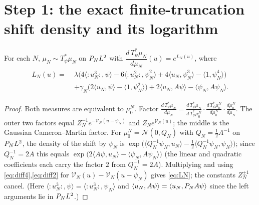 \section*{Step 1: the exact finite-truncation shift density and its logarithm}

\begin{qonelemma}\label{lem:density}
For each $N$, $\mu_N\sim T_\psi^*\mu_N$ on $P_N L^2$ with
$\dfrac{d\,T_\psi^*\mu_N}{d\mu_N}(u)=e^{L_N(u)}$, where
\begin{equation}\label{eq:LN}
\begin{aligned}
L_N(u)=\;&\lambda\bigl(4\langle{:}u_N^3{:},\psi\rangle-6\langle{:}u_N^2{:},\psi_N^2\rangle+4\langle u_N,\psi_N^3\rangle-\langle1,\psi_N^4\rangle\bigr)\\
&+\gamma_N\bigl(2\langle u_N,\psi\rangle-\langle1,\psi_N^2\rangle\bigr)+2\langle u_N,A\psi\rangle-\langle\psi_N,A\psi_N\rangle .
\end{aligned}
\end{equation}
\end{qonelemma}
\begin{proof}
Both measures are equivalent to $\mu_0^N$. Factor
$\frac{d\,T_\psi^*\mu_N}{d\mu_N}=\frac{d\,T_\psi^*\mu_N}{d\,T_\psi^*\mu_0^N}\cdot\frac{d\,T_\psi^*\mu_0^N}{d\mu_0^N}\cdot\frac{d\mu_0^N}{d\mu_N}$.
The outer two factors equal $Z_N^{-1}e^{-\mathcal V_N(u-\psi_N)}$ and
$Z_Ne^{\mathcal V_N(u)}$; the middle is the Gaussian Cameron--Martin factor. For
$\mu_0^N=\mathcal N(0,Q_N)$ with $Q_N=\tfrac12A^{-1}$ on $P_N L^2$, the density of the
shift by $\psi_N$ is
$\exp\bigl(\langle Q_N^{-1}\psi_N,u_N\rangle-\tfrac12\langle Q_N^{-1}\psi_N,\psi_N\rangle\bigr)$;
since $Q_N^{-1}=2A$ this equals
$\exp\bigl(2\langle A\psi,u_N\rangle-\langle\psi_N,A\psi_N\rangle\bigr)$ (the linear and
quadratic coefficients each carry the factor $2$ from $Q_N^{-1}=2A$).
Multiplying and using \eqref{eq:diff4},\eqref{eq:diff2} for
$\mathcal V_N(u)-\mathcal V_N(u-\psi_N)$ gives \eqref{eq:LN}; the constants $Z_N^{\pm1}$
cancel. (Here $\langle{:}u_N^3{:},\psi\rangle=\langle{:}u_N^3{:},\psi_N\rangle$ and
$\langle u_N,A\psi\rangle=\langle u_N,P_N A\psi\rangle$ since the left arguments lie
in $P_N L^2$.)
\end{proof}

